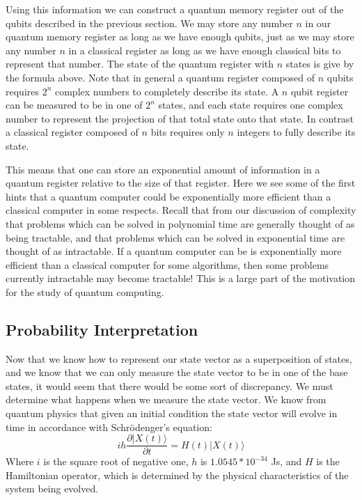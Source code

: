 \documentclass[]{article}
\begin{document}
Using this information we can construct a quantum memory register out
of the qubits described in the previous section.  We may store any
number $n$ in our quantum memory register as long as we have enough
qubits, just as we may store any number $n$ in a classical register as
long as we have enough classical bits to represent that number.  The
state of the quantum register with $n$ states is give by the formula
above.  Note that in general a quantum register composed of $n$ qubits
requires $2^{n}$ complex numbers to completely describe its state.  A
$n$ qubit register can be measured to be in one of $2^{n}$ states, and
each state requires one complex number to represent the projection of
that total state onto that state.  In contrast a classical register
composed of $n$ bits requires only $n$ integers to fully describe its
state.

This means that one can store an exponential amount of information in
a quantum register relative to the size of that register.  Here we see
some of the first hints that a quantum computer could be exponentially
more efficient than a classical computer in some respects.  Recall
that from our discussion of complexity that problems which can be
solved in polynomial time are generally thought of as being tractable,
and that problems which can be solved in exponential time are thought
of as intractable.  If a quantum computer can be is exponentially more
efficient than a classical computer for some algorithms, then some
problems currently intractable may become tractable!  This is a large
part of the motivation for the study of quantum computing.

\subsection{Probability Interpretation}

Now that we know how to represent our state vector as a superposition
of states, and we know that we can only measure the state vector to be
in one of the base states, it would seem that there would be some sort
of discrepancy.  We must determine what happens when we measure the
state vector.  We know from quantum physics that given an initial
condition the state vector will evolve in time in accordance with
Schr\"{o}denger's equation:
	\[ih\frac{\partial |X(t) \rangle }{\partial t} = H(t)|X(t) \rangle\]
Where $i$ is the square root of negative one, $h$ is $1.0545*10^{-34}$
Js, and $H$ is the Hamiltonian operator, which is determined by the
physical characteristics of the system being evolved.
\end{document}
